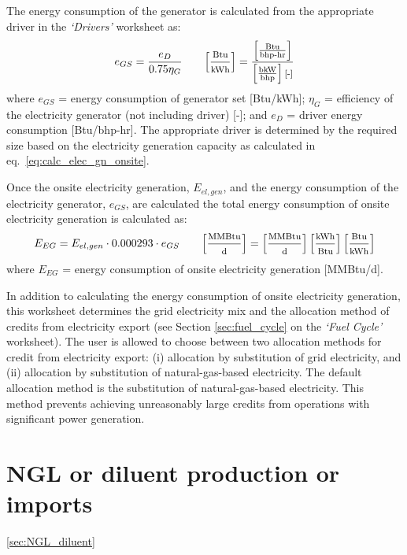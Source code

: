 \documentclass[11pt]{report}
\newcommand{\sheet}[1]{\textit{`{#1}'}}
\begin{document}
{The energy consumption of the generator is calculated from the appropriate driver in the \sheet{Drivers} worksheet as:
\begin{equation}
e_{GS} = \frac{e_{D}}{0.75 \eta_{G} } \quad\quad \footnotesize{\left[\frac{\text{Btu}}{\text{kWh}}\right] = \frac{\left[\frac{\text{Btu}}{\text{bhp-hr}}\right]}{\left[\frac{\text{bkW}}{\text{bhp}}\right] \text{[-]}}}
\end{equation}
where $e_{GS}$ = energy consumption of generator set [Btu/kWh]; $\eta_{G}$ = efficiency of the electricity generator (not including driver) [-]; and $e_{D}$ = driver energy consumption [Btu/bhp-hr]. The appropriate driver is determined by the required size based on the electricity generation capacity as calculated in eq.\ \eqref{eq:calc_elec_gn_onsite}.


Once the onsite electricity generation, $E_{el,gen}$, and the energy consumption of the electricity generator, $e_{GS}$, are calculated the total energy consumption of onsite electricity generation is calculated as:
\begin{equation}
E_{EG} = E_{el,gen} \cdot 0.000293 \cdot e_{GS} \quad\quad \footnotesize{\left[\frac{\text{MMBtu}}{\text{d}}\right] = \left[\frac{\text{MMBtu}}{\text{d}}\right] \left[\frac{\text{kWh}}{\text{Btu}}\right] \left[\frac{\text{Btu}}{\text{kWh}}\right]}
\end{equation}
where $E_{EG}$ = energy consumption of onsite electricity generation [MMBtu/d].

In addition to calculating the energy consumption of onsite electricity generation, this worksheet determines the grid electricity mix and the allocation method of credits from electricity export (see Section \ref{sec:fuel_cycle} on the \sheet{Fuel Cycle} worksheet). The user is allowed to choose between two allocation methods for credit from electricity export: (i) allocation by substitution of grid electricity, and (ii) allocation by substitution of natural-gas-based electricity. The default allocation method is the substitution of natural-gas-based electricity. This method prevents achieving unreasonably large credits from operations with significant power generation. 



\clearpage

\section{NGL or diluent production or imports}
\ref{sec:NGL_diluent}






}
\end{document}
